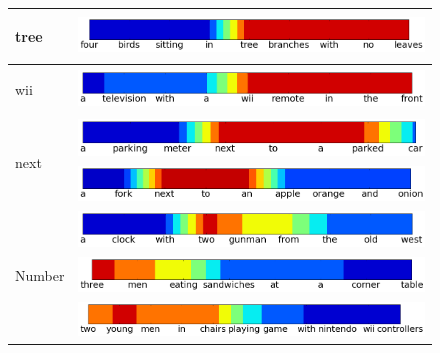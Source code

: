 \begin{figure}
\setlength{\tabcolsep}{0pt}
\centering
\begin{tabular}{l|r}

\multirow{1}{*}{\begin{sideways}\sf tree\end{sideways}} & 
\includegraphics[scale=0.25]{dimensions/tree} \\
\hline
\multirow{1}{*}{\begin{sideways}\sf wii\end{sideways}} & 
 \includegraphics[scale=0.25]{dimensions/wii}  \\
\hline
\multirow{2}{*}{\begin{sideways}\sf next\end{sideways}} & 
\includegraphics[scale=0.25]{dimensions/nextoacarvis} \\
& \includegraphics[scale=0.25]{dimensions/nexttoanvis}  \\
\hline
\hline
\multirow{3}{*}{\begin{sideways}\sf Number\end{sideways}} & 
\includegraphics[scale=0.25]{dimensions/twogunmanvis}  \\
& \includegraphics[scale=0.25]{dimensions/threemeneatingvis} \\
& \includegraphics[scale=0.25]{dimensions/twoyoungmenvis} \\

\end{tabular}
\end{figure}
